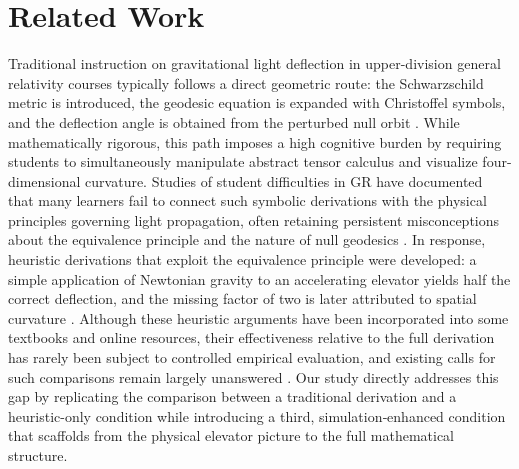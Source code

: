 \documentclass{article}
\begin{document}
\section{Related Work}

Traditional instruction on gravitational light deflection in upper-division general relativity courses typically follows a direct geometric route: the Schwarzschild metric is introduced, the geodesic equation is expanded with Christoffel symbols, and the deflection angle is obtained from the perturbed null orbit \cite{hartle_gravity_2003}. While mathematically rigorous, this path imposes a high cognitive burden by requiring students to simultaneously manipulate abstract tensor calculus and visualize four-dimensional curvature. Studies of student difficulties in GR have documented that many learners fail to connect such symbolic derivations with the physical principles governing light propagation, often retaining persistent misconceptions about the equivalence principle and the nature of null geodesics \cite{baily_empirical_2015}. In response, heuristic derivations that exploit the equivalence principle were developed: a simple application of Newtonian gravity to an accelerating elevator yields half the correct deflection, and the missing factor of two is later attributed to spatial curvature \cite{bodenner_will_2003}. Although these heuristic arguments have been incorporated into some textbooks and online resources, their effectiveness relative to the full derivation has rarely been subject to controlled empirical evaluation, and existing calls for such comparisons remain largely unanswered \cite{baily_empirical_2015,posner_empirical_2020}. Our study directly addresses this gap by replicating the comparison between a traditional derivation and a heuristic-only condition while introducing a third, simulation‑enhanced condition that scaffolds from the physical elevator picture to the full mathematical structure.
\end{document}
